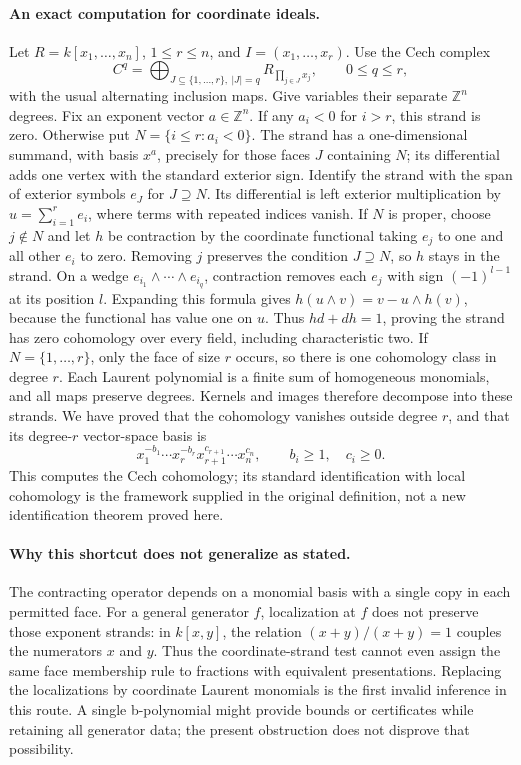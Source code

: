 \documentclass[11pt]{article}
\begin{document}
\paragraph{An exact computation for coordinate ideals.}
Let $R=k[x_1,\ldots,x_n]$, $1\le r\le n$, and $I=(x_1,\ldots,x_r)$.
Use the Cech complex
\[
C^q=\bigoplus_{J\subseteq\{1,\ldots,r\},\ |J|=q} R_{\prod_{j\in J}x_j},
\qquad 0\le q\le r,
\]
with the usual alternating inclusion maps. Give variables their separate
$\mathbb Z^n$ degrees. Fix an exponent vector $a\in\mathbb Z^n$.
If any $a_i<0$ for $i>r$, this strand is zero. Otherwise put
$N=\{i\le r:a_i<0\}$. The strand has a one-dimensional summand, with basis
$x^a$, precisely for those faces $J$ containing $N$; its differential adds
one vertex with the standard exterior sign.
Identify the strand with the span of exterior symbols $e_J$ for $J\supseteq N$.
Its differential is left exterior multiplication by $u=\sum_{i=1}^r e_i$,
where terms with repeated indices vanish. If $N$ is proper, choose $j\notin N$
and let $h$ be contraction by the coordinate functional taking $e_j$ to one
and all other $e_i$ to zero. Removing $j$ preserves the condition $J\supseteq N$,
so $h$ stays in the strand. On a wedge $e_{i_1}\wedge\cdots\wedge e_{i_q}$,
contraction removes each $e_j$ with sign $(-1)^{l-1}$ at its position $l$.
Expanding this formula gives
$h(u\wedge v)=v-u\wedge h(v)$, because the functional has value one on $u$.
Thus $hd+dh=1$, proving the strand has zero cohomology over every field,
including characteristic two. If $N=\{1,\ldots,r\}$, only the face of size $r$
occurs, so there is one cohomology class in degree $r$.
Each Laurent polynomial is a finite sum of homogeneous monomials, and all
maps preserve degrees. Kernels and images therefore decompose into these
strands. We have proved that the cohomology vanishes outside degree $r$, and
that its degree-$r$ vector-space basis is
\[
x_1^{-b_1}\cdots x_r^{-b_r}x_{r+1}^{c_{r+1}}\cdots x_n^{c_n},
\qquad b_i\ge1,\quad c_i\ge0.
\]
This computes the Cech cohomology; its standard identification with local
cohomology is the framework supplied in the original definition, not a new
identification theorem proved here.

\paragraph{Why this shortcut does not generalize as stated.}
The contracting operator depends on a monomial basis with a single copy in
each permitted face. For a general generator $f$, localization at $f$ does not
preserve those exponent strands: in $k[x,y]$, the relation
$(x+y)/(x+y)=1$ couples the numerators $x$ and $y$.
Thus the coordinate-strand test cannot even assign the same face membership
rule to fractions with equivalent presentations. Replacing the localizations
by coordinate Laurent monomials is the first invalid inference in this route.
A single b-polynomial might provide bounds or certificates while retaining
all generator data; the present obstruction does not disprove that possibility.
\end{document}
